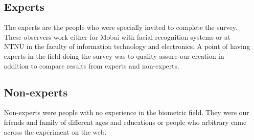 \subsection*{Experts}
The experts are the people who were specially invited to complete the survey. These observers work either for Mobai with facial recognition systems or at NTNU in the faculty of information technology and electronics. A point of having experts in the field doing the survey was to quality assure our creation in addition to compare results from experts and non-experts. 

\subsection*{Non-experts}
Non-experts were people with no experience in the biometric field. They were our friends and family of different ages and educations or people who arbitrary came across the experiment on the web. 

